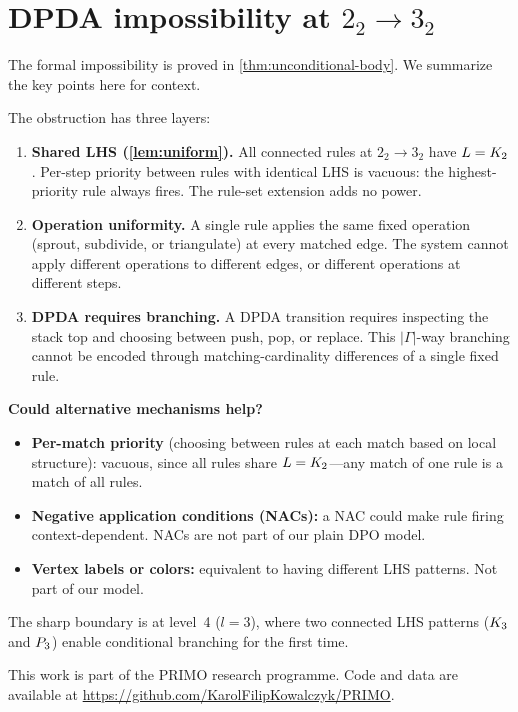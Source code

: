 \documentclass{../shared/primo}
\begin{document}
\section{DPDA impossibility at \texorpdfstring{$2_2 \to 3_2$}{2\_2 -> 3\_2}}
\label{app:dpda}

The formal impossibility is proved in \cref{thm:unconditional-body}. We summarize the key points here for context.

The obstruction has three layers:
\begin{enumerate}
\item \textbf{Shared LHS (\cref{lem:uniform}).} All connected rules at $2_2 \to 3_2$ have $L = K_{2}$. Per-step priority between rules with identical LHS is vacuous: the highest-priority rule always fires. The rule-set extension adds no power.

\item \textbf{Operation uniformity.} A single rule applies the same fixed operation (sprout, subdivide, or triangulate) at every matched edge. The system cannot apply different operations to different edges, or different operations at different steps.

\item \textbf{DPDA requires branching.} A DPDA transition requires inspecting the stack top and choosing between push, pop, or replace. This $|\Gamma|$-way branching cannot be encoded through matching-cardinality differences of a single fixed rule.
\end{enumerate}

\textbf{Could alternative mechanisms help?}
\begin{itemize}
\item \textbf{Per-match priority} (choosing between rules at each match based on local structure): vacuous, since all rules share $L = K_{2}$---any match of one rule is a match of all rules.
\item \textbf{Negative application conditions (NACs):} a NAC could make rule firing context-dependent. NACs are not part of our plain DPO model.
\item \textbf{Vertex labels or colors:} equivalent to having different LHS patterns. Not part of our model.
\end{itemize}

The sharp boundary is at level~4 ($l = 3$), where two connected LHS patterns ($K_{3}$ and $P_{3}$) enable conditional branching for the first time.


\begin{acknowledgments}
This work is part of the PRIMO research programme. Code and data are available at \url{https://github.com/KarolFilipKowalczyk/PRIMO}.
\end{acknowledgments}



\end{document}
